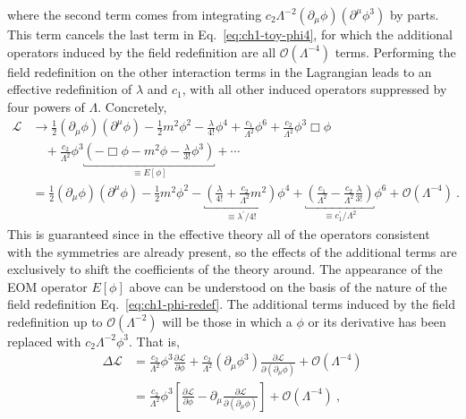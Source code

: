 where the second term comes from integrating
$c_{2} \Lambda^{-2} (\partial_{\mu} \phi) (\partial^{\mu} \phi^{3})$ by parts.
This term cancels the last term in Eq.~\eqref{eq:ch1-toy-phi4}, for which the
additional operators induced by the field redefinition are all
$\mathcal{O}(\Lambda^{-4})$ terms. Performing the field redefinition on the
other interaction terms in the Lagrangian leads to an effective redefinition of
$\lambda$ and $c_{1}$, with all other induced operators suppressed by four
powers of $\Lambda$. Concretely,
\begin{equation}
  \begin{aligned}
    \mathscr{L} &\to \frac{1}{2} (\partial_{\mu} \phi) (\partial^{\mu} \phi) - \frac{1}{2} m^{2} \phi^{2} - \frac{\lambda}{4!} \phi^{4} + \frac{c_{1}}{\Lambda^{2}} \phi^{6} + \frac{c_{2}}{\Lambda^{2}} \phi^{3} \Box \phi \\
    &\quad + \frac{c_{2}}{\Lambda^{2}} \phi^{3} \underbracket{\left( - \Box \phi - m^{2} \phi - \frac{\lambda}{3!}\phi^{3} \right)}_{\equiv E[\phi]} + \cdots \\
    &= \frac{1}{2} (\partial_{\mu} \phi) (\partial^{\mu} \phi) - \frac{1}{2} m^{2} \phi^{2} - \underbracket{\left( \frac{\lambda}{4!} + \frac{c_{2}}{\Lambda^{2}}m^{2} \right)}_{\equiv \lambda^{\prime} / 4!} \phi^{4} + \underbracket{\left( \frac{c_{1}}{\Lambda^{2}} - \frac{c_{2}}{\Lambda^{2}} \frac{\lambda}{3!} \right)}_{\equiv c^{\prime}_{1} / \Lambda^{2}}\phi^{6} + \mathcal{O}(\Lambda^{-4}) \ .
  \end{aligned}
\end{equation}
This is guaranteed since in the effective theory all of the operators consistent
with the symmetries are already present, so the effects of the additional terms
are exclusively to shift the coefficients of the theory around. The appearance
of the EOM operator $E[\phi]$ above can be understood on the basis of the nature
of the field redefinition Eq.~\eqref{eq:ch1-phi-redef}. The additional terms induced
by the field redefinition up to $\mathcal{O}(\Lambda^{-2})$ will be those in
which a $\phi$ or its derivative has been replaced with
$c_{2} \Lambda^{-2} \phi^{3}$. That is,
\begin{equation}
  \begin{aligned}
    \Delta \mathscr{L} &= \frac{c_{2}}{\Lambda^{2}} \phi^{3} \frac{\partial \mathscr{L}}{\partial \phi} + \frac{c_{2}}{\Lambda^{2}} (\partial_{\mu} \phi^{3}) \frac{\partial \mathscr{L}}{\partial (\partial_{\mu} \phi)} + \mathcal{O}(\Lambda^{-4}) \\
    &= \frac{c_{2}}{\Lambda^{2}} \phi^{3} \left[ \frac{\partial \mathscr{L}}{\partial \phi} - \partial_{\mu} \frac{\partial \mathscr{L}}{\partial (\partial_{\mu} \phi)} \right]  + \mathcal{O}(\Lambda^{-4}) \ ,
  \end{aligned}
\end{equation}
